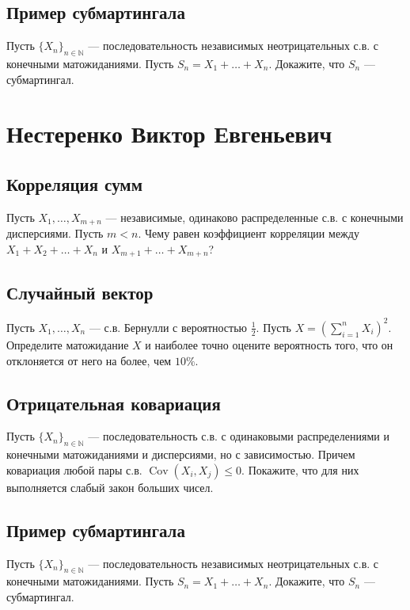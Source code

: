 \documentclass[12pt]{article}
\newcommand\N{\mathbb{N}}
\DeclareMathOperator{\Cov}{Cov}
\begin{document}
\subsection{Пример субмартингала}

Пусть $\{X_n\}_{n \in \N}$ --- последовательность независимых неотрицательных с.в. с конечными матожиданиями. Пусть $S_n = X_1 + \dots + X_n$. Докажите, что $S_n$ --- субмартингал.

\newpage
\section{Нестеренко Виктор Евгеньевич}

\subsection{Корреляция сумм}

Пусть $X_1, \dots, X_{m + n}$ --- независимые, одинаково распределенные с.в. с конечными дисперсиями. Пусть $m < n$. Чему равен коэффициент корреляции между $X_1 + X_2 + \dots + X_n$ и $X_{m + 1} + \dots + X_{m + n}$?

\subsection{Случайный вектор}

Пусть $X_1, \dots, X_n$ --- с.в. Бернулли с вероятностью $\frac{1}{2}$. Пусть $X = (\sum_{i = 1}^n X_i)^2$. Определите матожидание $X$ и наиболее точно оцените вероятность того, что он отклоняется от него на более, чем $10\%$.


\subsection{Отрицательная ковариация}

Пусть $\{X_n\}_{n \in \N}$ --- последовательность с.в. с одинаковыми распределениями и конечными матожиданиями и дисперсиями, но с зависимостью. Причем ковариация любой пары с.в. $\Cov(X_i, X_j) \le 0$. Покажите, что для них выполняется слабый закон больших чисел.


\subsection{Пример субмартингала}

Пусть $\{X_n\}_{n \in \N}$ --- последовательность независимых неотрицательных с.в. с конечными матожиданиями. Пусть $S_n = X_1 + \dots + X_n$. Докажите, что $S_n$ --- субмартингал.
\end{document}
